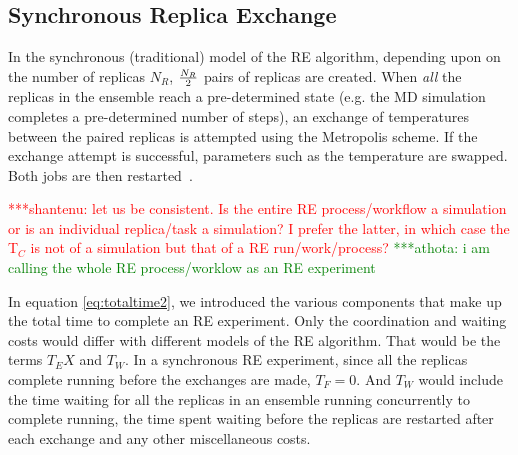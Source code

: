 \documentclass{rspublic}
\newcommand{\jhanote}[1]{ {\textcolor{red} { ***shantenu: #1 }}}
\newcommand{\alnote}[1]{ {\textcolor{blue} { ***andre: #1 }}}
\newcommand{\athotanote}[1]{ {\textcolor{green} { ***athota: #1 }}}
\newcommand{\alnote}[1]{}
\newcommand{\athotanote}[1]{}
\newcommand{\jhanote}[1]{}
\begin{document}

\subsection{Synchronous Replica Exchange}

  In the synchronous (traditional)
model of the RE algorithm, depending upon on the number of replicas ${N_R}$, 
${N_R \over 2}$ pairs of replicas are created. When \emph{all} the replicas in the ensemble reach a
pre-determined state (e.g. the MD simulation completes a pre-determined
number of steps), %
an exchange of temperatures between the paired replicas is attempted
using the Metropolis scheme. %
If the exchange attempt is successful, parameters such as the
temperature are swapped. Both jobs are then
restarted~\citep{Luckow:2008fp}.




\jhanote{let us be consistent. Is the entire RE process/workflow a
  simulation or is an individual replica/task a simulation? I prefer
  the latter, in which case the T$_C$ is not of a simulation but that
  of a RE run/work/process?} \athotanote{i am calling the whole RE process/worklow as an RE experiment}

In equation \ref{eq:totaltime2}, we introduced the various components that make up the total time to complete an RE experiment. Only the coordination and waiting costs would differ with different models of the RE algorithm. That would be the terms $T_EX$ and $T_W$. In a synchronous RE experiment, since all the replicas complete running before the exchanges are made, $T_F = 0$. And $T_W$ would include the time waiting for all the replicas in an ensemble running concurrently to complete running, the time spent waiting before the replicas are restarted after each exchange and any other miscellaneous costs.
\end{document}
